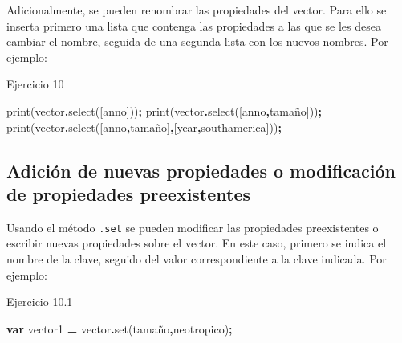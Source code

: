\documentclass[
  12pt,
  letterpaper,
  twoside]{book}
\newenvironment{Shaded}{\begin{snugshade}}{\end{snugshade}}
\newcommand{\FunctionTok}[1]{\textcolor[rgb]{0.00,0.00,0.00}{#1}}
\newcommand{\KeywordTok}[1]{\textcolor[rgb]{0.13,0.29,0.53}{\textbf{#1}}}
\newcommand{\NormalTok}[1]{#1}
\newcommand{\OperatorTok}[1]{\textcolor[rgb]{0.81,0.36,0.00}{\textbf{#1}}}
\newcommand{\StringTok}[1]{\textcolor[rgb]{0.31,0.60,0.02}{#1}}
\begin{document}
Adicionalmente, se pueden renombrar las propiedades del vector. Para ello se inserta primero una lista que contenga las propiedades a las que se les desea cambiar el nombre, seguida de una segunda lista con los nuevos nombres. Por ejemplo:

Ejercicio 10

\begin{Shaded}
\begin{Highlighting}[]
\FunctionTok{print}\NormalTok{(vector}\OperatorTok{.}\FunctionTok{select}\NormalTok{([}\StringTok{\textquotesingle{}anno\textquotesingle{}}\NormalTok{]))}\OperatorTok{;}
\FunctionTok{print}\NormalTok{(vector}\OperatorTok{.}\FunctionTok{select}\NormalTok{([}\StringTok{\textquotesingle{}anno\textquotesingle{}}\OperatorTok{,}\StringTok{\textquotesingle{}tamaño\textquotesingle{}}\NormalTok{]))}\OperatorTok{;}
\FunctionTok{print}\NormalTok{(vector}\OperatorTok{.}\FunctionTok{select}\NormalTok{([}\StringTok{\textquotesingle{}anno\textquotesingle{}}\OperatorTok{,}\StringTok{\textquotesingle{}tamaño\textquotesingle{}}\NormalTok{]}\OperatorTok{,}\NormalTok{[}\StringTok{\textquotesingle{}year\textquotesingle{}}\OperatorTok{,}\StringTok{\textquotesingle{}southamerica\textquotesingle{}}\NormalTok{]))}\OperatorTok{;}
\end{Highlighting}
\end{Shaded}

\hypertarget{adiciuxf3n-de-nuevas-propiedades-o-modificaciuxf3n-de-propiedades-preexistentes}{%
\subsection{Adición de nuevas propiedades o modificación de propiedades preexistentes}\label{adiciuxf3n-de-nuevas-propiedades-o-modificaciuxf3n-de-propiedades-preexistentes}}

Usando el método \texttt{.set} se pueden modificar las propiedades preexistentes o escribir nuevas propiedades sobre el vector. En este caso, primero se indica el nombre de la clave, seguido del valor correspondiente a la clave indicada. Por ejemplo:

Ejercicio 10.1

\begin{Shaded}
\begin{Highlighting}[]
\KeywordTok{var}\NormalTok{ vector1 }\OperatorTok{=}\NormalTok{ vector}\OperatorTok{.}\FunctionTok{set}\NormalTok{(}\StringTok{\textquotesingle{}tamaño\textquotesingle{}}\OperatorTok{,}\StringTok{\textquotesingle{}neotropico\textquotesingle{}}\NormalTok{)}\OperatorTok{;}
\end{Highlighting}
\end{Shaded}
\end{document}
